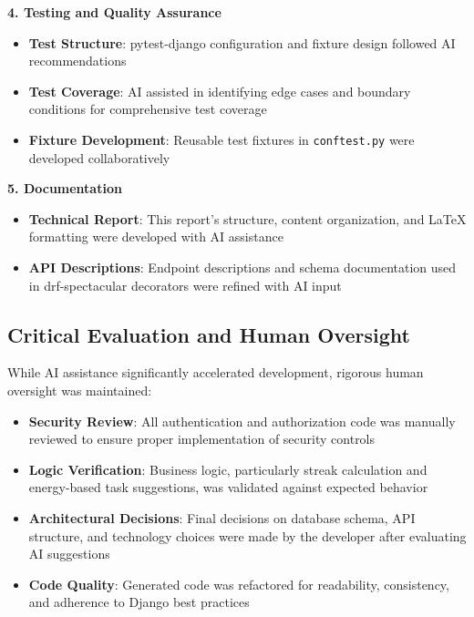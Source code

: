 \documentclass[11pt,a4paper]{article}
\begin{document}
\textbf{4. Testing and Quality Assurance}

\begin{itemize}[noitemsep]
    \item \textbf{Test Structure}: pytest-django configuration and fixture design followed AI recommendations
    \item \textbf{Test Coverage}: AI assisted in identifying edge cases and boundary conditions for comprehensive test coverage
    \item \textbf{Fixture Development}: Reusable test fixtures in \texttt{conftest.py} were developed collaboratively
\end{itemize}

\textbf{5. Documentation}

\begin{itemize}[noitemsep]
    \item \textbf{Technical Report}: This report's structure, content organization, and LaTeX formatting were developed with AI assistance
    \item \textbf{API Descriptions}: Endpoint descriptions and schema documentation used in drf-spectacular decorators were refined with AI input
\end{itemize}

\subsection{Critical Evaluation and Human Oversight}

While AI assistance significantly accelerated development, rigorous human oversight was maintained:

\begin{itemize}[noitemsep]
    \item \textbf{Security Review}: All authentication and authorization code was manually reviewed to ensure proper implementation of security controls
    \item \textbf{Logic Verification}: Business logic, particularly streak calculation and energy-based task suggestions, was validated against expected behavior
    \item \textbf{Architectural Decisions}: Final decisions on database schema, API structure, and technology choices were made by the developer after evaluating AI suggestions
    \item \textbf{Code Quality}: Generated code was refactored for readability, consistency, and adherence to Django best practices
\end{itemize}
\end{document}
